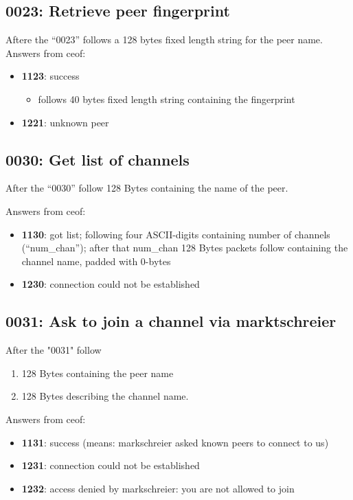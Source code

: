 \documentclass[12pt,a4paper]{book}
\begin{document}
\subsection{0023: Retrieve peer fingerprint}
Aftere the "`0023"' follows a 128 bytes fixed length string for the peer name.
Answers from ceof:
\begin{itemize}
\item \textbf{1123}: success
\begin{itemize}
\item follows 40 bytes fixed length string containing the fingerprint
\end{itemize}
\item \textbf{1221}: unknown peer
\end{itemize}
\subsection{0030: Get list of channels}
After the "`0030"' follow 128 Bytes containing the 
name of the peer.

Answers from ceof:

\begin{itemize}
\item \textbf{1130}: got list; following four ASCII-digits containing
number of channels ("`num\_chan"'); after that  num\_chan 128 Bytes packets
follow containing the channel name, padded with 0-bytes
\item \textbf{1230}: connection could not be established
\end{itemize}
\subsection{0031: Ask to join a channel via marktschreier}
After the "0031" follow

\begin{enumerate}
\item 128 Bytes containing the peer name
\item 128 Bytes describing the channel name.
\end{enumerate}

Answers from ceof:
\begin{itemize}
\item \textbf{1131}: success (means: markschreier asked known peers to
connect to us)
\item \textbf{1231}: connection could not be established
\item \textbf{1232}: access denied by markschreier: you are not allowed to join
\end{itemize}
\end{document}
